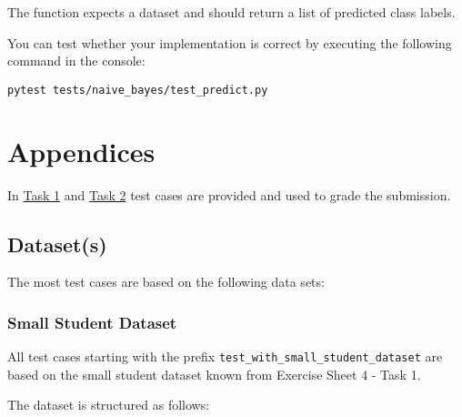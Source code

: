 \documentclass[
english,
smallborders
]{i6prcsht}
\begin{document}
\vspace*{0.5cm}

The function expects a dataset and should return a list of predicted class labels.

You can test whether your implementation is correct by executing the following command in the console:

\vspace*{0.3cm}

\begin{lstlisting}
pytest tests/naive_bayes/test_predict.py
\end{lstlisting}

\newpage

\section*{Appendices}

In \hyperref[sec:task-one]{Task 1} and \hyperref[sec:task-two]{Task 2} test cases are provided and used to grade the submission.

\subsection*{Dataset(s)}

The most test cases are based on the following data sets:

\subsubsection*{Small Student Dataset}

All test cases starting with the prefix \texttt{test\_with\_small\_student\_dataset} are based on the small student dataset known from Exercise Sheet 4 - Task 1.

The dataset is structured as follows:

\vspace*{1cm}

\begin{table}[ht]
	\centering
	\caption{Small Student Dataset}
	\label{tab:small-student-dataset}
\end{table}
\end{document}
